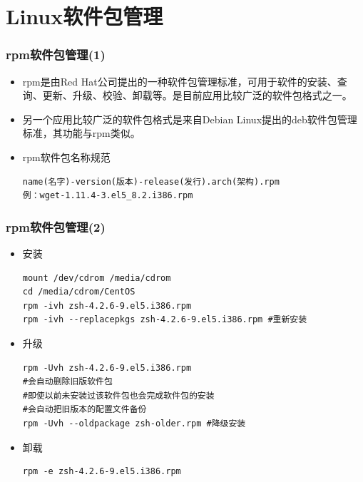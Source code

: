 \documentclass[xcolor=svgnames,presentation]{beamer}
\begin{document}
\section{Linux软件包管理}
\label{sec-3}
\begin{frame}[fragile]
\frametitle{rpm软件包管理(1)}
\label{sec-3-1}
\begin{itemize}

\item rpm是由Red Hat公司提出的一种软件包管理标准，可用于软件的安装、查询、更新、升级、校验、卸载等。是目前应用比较广泛的软件包格式之一。
\label{sec-3-1-1}%

\item 另一个应用比较广泛的软件包格式是来自Debian Linux提出的deb软件包管理标准，其功能与rpm类似。
\label{sec-3-1-2}%

\item rpm软件包名称规范\\
\label{sec-3-1-3}%
\begin{verbatim}
name(名字)-version(版本)-release(发行).arch(架构).rpm
例：wget-1.11.4-3.el5_8.2.i386.rpm
\end{verbatim}
\end{itemize} %
\end{frame}
\begin{frame}[fragile]
\frametitle{rpm软件包管理(2)}
\label{sec-3-2}
\begin{itemize}

\item 安装\\
\label{sec-3-2-1}%
\begin{verbatim}
mount /dev/cdrom /media/cdrom
cd /media/cdrom/CentOS
rpm -ivh zsh-4.2.6-9.el5.i386.rpm
rpm -ivh --replacepkgs zsh-4.2.6-9.el5.i386.rpm #重新安装
\end{verbatim}

\item 升级\\
\label{sec-3-2-2}%
\begin{verbatim}
rpm -Uvh zsh-4.2.6-9.el5.i386.rpm
#会自动删除旧版软件包
#即使以前未安装过该软件包也会完成软件包的安装
#会自动把旧版本的配置文件备份
rpm -Uvh --oldpackage zsh-older.rpm #降级安装
\end{verbatim}

\item 卸载\\
\label{sec-3-2-3}%
\begin{verbatim}
rpm -e zsh-4.2.6-9.el5.i386.rpm
\end{verbatim}
\end{itemize} %
\end{frame}
\end{document}
